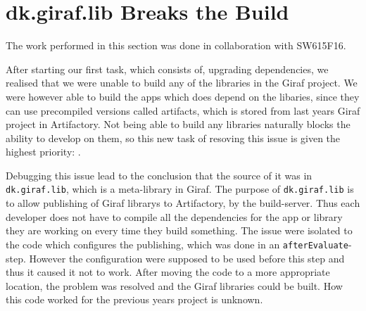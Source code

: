 \section{dk.giraf.lib Breaks the Build}\label{sec:breaking}
The work performed in this section was done in collaboration with SW615F16.

After starting our first task, which consists of, upgrading dependencies, we realised that we were unable to build any of the libraries in the Giraf project. 
We were however able to build the apps which does depend on the libaries, since they can use precompiled versions called artifacts, which is stored from last years Giraf project in Artifactory. 
Not being able to build any libraries naturally blocks the ability to develop on them, so this new task of resoving this issue is given the highest priority: \pblocking. 

Debugging this issue lead to the conclusion that the source of it was in \texttt{dk.giraf.lib}, which is a meta-library in Giraf.
The purpose of \texttt{dk.giraf.lib} is to allow publishing of Giraf librarys to Artifactory, by the build-server.
Thus each developer does not have to compile all the dependencies for the app or library they are working on every time they build something. 
The issue were isolated to the code which configures the publishing, which was done in an \texttt{afterEvaluate}-step. 
However the configuration were supposed to be used before this step and thus it caused it not to work. 
After moving the code to a more appropriate location, the problem was resolved and the Giraf libraries could be built.
How this code worked for the previous years project is unknown. 